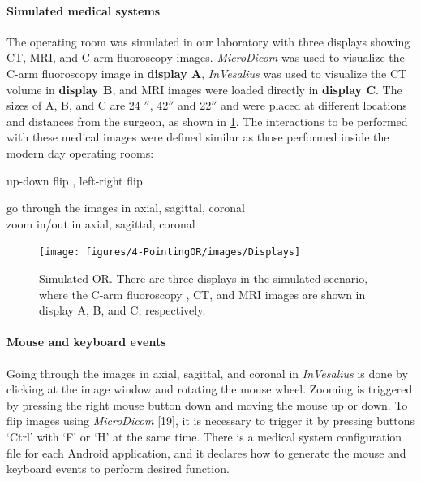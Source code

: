 \paragraph{Simulated medical systems}
The operating room was simulated in our laboratory with three displays showing CT, MRI, and C-arm fluoroscopy images. 
\textit{MicroDicom}\cite{Tangcharoen2011} was used to visualize the C-arm fluoroscopy image in \textbf{display A}, \textit{InVesalius}\cite{Moraes2012} was used to visualize the CT volume in \textbf{display B}, and MRI images were loaded directly in \textbf{display C}. The sizes of A, B, and C are 24 $''$, 42$''$ and 22$''$ and were placed at different locations and distances from the surgeon, as shown in \figurename{\ref{fig:ORSEnvironment}}. The interactions to be performed with these medical images were defined similar as those performed inside the modern day operating rooms:
\begin{description}
	[align=right,style=nextline,leftmargin= 0.3\linewidth,labelsep=\parindent,font=\normalfont]
	\item [Fluoroscopy image:] up-down flip , left-right flip
	\item [CT \& MRI images:] go through the images in axial, sagittal, coronal\\ zoom in/out in axial, sagittal, coronal
\end{description}
\begin{figure}
	\centering
	\texttt{[image: figures/4-PointingOR/images/Displays]}
	\caption{Simulated OR. There are three displays in the simulated scenario, where the C-arm fluoroscopy , CT, and MRI images are shown in display A, B, and C, respectively.}
	\label{fig:ORSEnvironment}       %
\end{figure}
\paragraph{Mouse and keyboard events} 
Going through the images in axial, sagittal, and coronal in \textit{InVesalius}\cite{Moraes2012} is done by clicking at the image window and rotating the mouse wheel. Zooming is triggered by pressing the right mouse button down and moving the mouse up or down. To flip images using \textit{MicroDicom} [19], it is necessary to trigger it by pressing buttons `Ctrl' with `F' or `H' at the same time. There is a  medical system configuration file for each Android application, and it declares how to generate the mouse and keyboard events to perform desired function.


